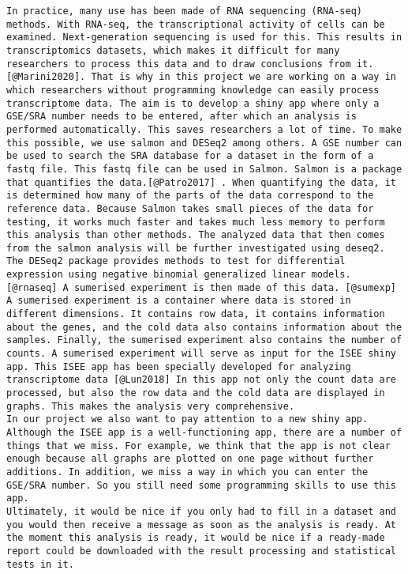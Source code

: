 \documentclass[
]{book}
\begin{document}
\begin{verbatim}
In practice, many use has been made of RNA sequencing (RNA-seq) methods. With RNA-seq, the transcriptional activity of cells can be examined. Next-generation sequencing is used for this. This results in transcriptomics datasets, which makes it difficult for many researchers to process this data and to draw conclusions from it. [@Marini2020]. That is why in this project we are working on a way in which researchers without programming knowledge can easily process transcriptome data. The aim is to develop a shiny app where only a GSE/SRA number needs to be entered, after which an analysis is performed automatically. This saves researchers a lot of time. To make this possible, we use salmon and DESeq2 among others. A GSE number can be used to search the SRA database for a dataset in the form of a fastq file. This fastq file can be used in Salmon. Salmon is a package that quantifies the data.[@Patro2017] . When quantifying the data, it is determined how many of the parts of the data correspond to the reference data. Because Salmon takes small pieces of the data for testing, it works much faster and takes much less memory to perform this analysis than other methods. The analyzed data that then comes from the salmon analysis will be further investigated using deseq2. The DESeq2 package provides methods to test for differential expression using negative binomial generalized linear models. [@rnaseq] A sumerised experiment is then made of this data. [@sumexp] A sumerised experiment is a container where data is stored in different dimensions. It contains row data, it contains information about the genes, and the cold data also contains information about the samples. Finally, the sumerised experiment also contains the number of counts. A sumerised experiment will serve as input for the ISEE shiny app. This ISEE app has been specially developed for analyzing transcriptome data [@Lun2018] In this app not only the count data are processed, but also the row data and the cold data are displayed in graphs. This makes the analysis very comprehensive.
In our project we also want to pay attention to a new shiny app. Although the ISEE app is a well-functioning app, there are a number of things that we miss. For example, we think that the app is not clear enough because all graphs are plotted on one page without further additions. In addition, we miss a way in which you can enter the GSE/SRA number. So you still need some programming skills to use this app.
Ultimately, it would be nice if you only had to fill in a dataset and you would then receive a message as soon as the analysis is ready. At the moment this analysis is ready, it would be nice if a ready-made report could be downloaded with the result processing and statistical tests in it.


\end{verbatim}
\end{document}
